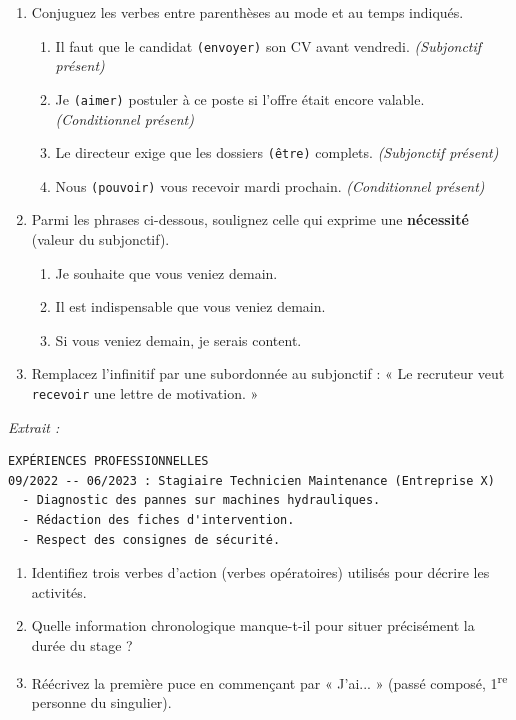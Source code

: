 \documentclass[11pt]{article}
\begin{document}
\begin{exercice}
\begin{enumerate}
    \item Conjuguez les verbes entre parenthèses au mode et au temps indiqués.
    \begin{enumerate}[label=\alph*)]
        \item Il faut que le candidat \texttt{(envoyer)} son CV avant vendredi. \textit{(Subjonctif présent)}
        \item Je \texttt{(aimer)} postuler à ce poste si l'offre était encore valable. \textit{(Conditionnel présent)}
        \item Le directeur exige que les dossiers \texttt{(être)} complets. \textit{(Subjonctif présent)}
        \item Nous \texttt{(pouvoir)} vous recevoir mardi prochain. \textit{(Conditionnel présent)}
    \end{enumerate}
    \item Parmi les phrases ci-dessous, soulignez celle qui exprime une \textbf{nécessité} (valeur du subjonctif).
    \begin{enumerate}[label=\alph*)]
        \item Je souhaite que vous veniez demain.
        \item Il est indispensable que vous veniez demain.
        \item Si vous veniez demain, je serais content.
    \end{enumerate}
    \item Remplacez l'infinitif par une subordonnée au subjonctif : « Le recruteur veut \texttt{recevoir} une lettre de motivation. »
\end{enumerate}
\end{exercice}

\begin{exercice}
\textit{Extrait :}
\begin{verbatim}
EXPÉRIENCES PROFESSIONNELLES
09/2022 -- 06/2023 : Stagiaire Technicien Maintenance (Entreprise X)
  - Diagnostic des pannes sur machines hydrauliques.
  - Rédaction des fiches d'intervention.
  - Respect des consignes de sécurité.
\end{verbatim}
\begin{enumerate}
    \item Identifiez trois verbes d'action (verbes opératoires) utilisés pour décrire les activités.
    \item Quelle information chronologique manque-t-il pour situer précisément la durée du stage ?
    \item Réécrivez la première puce en commençant par « J'ai... » (passé composé, 1\textsuperscript{re} personne du singulier).
\end{enumerate}
\end{exercice}
\end{document}
